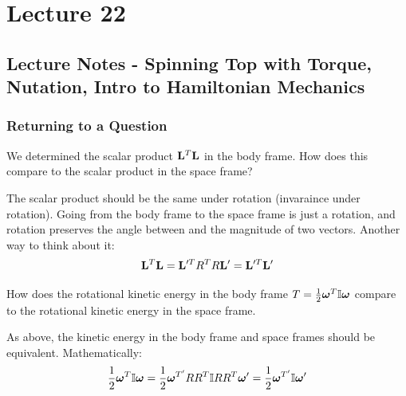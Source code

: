 \section{Lecture 22}
\subsection{Lecture Notes - Spinning Top with Torque, Nutation, Intro to Hamiltonian Mechanics}
\subsubsection{Returning to a Question}
We determined the scalar product $\mathbf{L}^T\mathbf{L}$ in the body frame. How does this compare to the scalar product in the space frame?
\begin{s}
The scalar product should be the same under rotation (invaraince under rotation). Going from the body frame to the space frame is just a rotation, and rotation preserves the angle between and the magnitude of two vectors. Another way to think about it:
\[\mathbf{L}^T\mathbf{L} = \mathbf{L}'^TR^TR\mathbf{L}' = \mathbf{L}'^T\mathbf{L}'\]
\end{s}
How does the rotational kinetic energy in the body frame $T = \frac{1}{2}\bm{\omega}^T\mathbb{I}\bm{\omega}$ compare to the rotational kinetic energy in the space frame.
\begin{s}
As above, the kinetic energy in the body frame and space frames should be equivalent. Mathematically:
\[\frac{1}{2}\bm{\omega}^T\mathbb{I}\bm{\omega} = \frac{1}{2}\bm{\omega}^{T'}RR^T\mathbb{I} RR^T\bm{\omega}' = \frac{1}{2}\bm{\omega}^{T'}\mathbb{I}\bm{\omega}'\]
\end{s}

